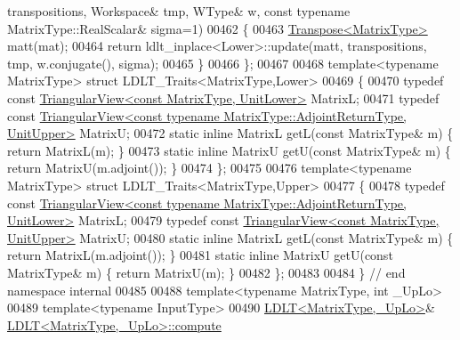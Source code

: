 \begin{DoxyCode}
      transpositions, Workspace& tmp, WType& w, \textcolor{keyword}{const} \textcolor{keyword}{typename} MatrixType::RealScalar& sigma=1)
00462   \{
00463     \hyperlink{group___core___module_class_eigen_1_1_transpose}{Transpose<MatrixType>} matt(mat);
00464     \textcolor{keywordflow}{return} ldlt\_inplace<Lower>::update(matt, transpositions, tmp, w.conjugate(), sigma);
00465   \}
00466 \};
00467 
00468 \textcolor{keyword}{template}<\textcolor{keyword}{typename} MatrixType> \textcolor{keyword}{struct }LDLT\_Traits<MatrixType,Lower>
00469 \{
00470   \textcolor{keyword}{typedef} \textcolor{keyword}{const} \hyperlink{group___core___module_class_eigen_1_1_triangular_view}{TriangularView<const MatrixType, UnitLower>} 
      MatrixL;
00471   \textcolor{keyword}{typedef} \textcolor{keyword}{const} 
      \hyperlink{group___core___module_class_eigen_1_1_triangular_view}{TriangularView<const typename MatrixType::AdjointReturnType, UnitUpper>}
       MatrixU;
00472   \textcolor{keyword}{static} \textcolor{keyword}{inline} MatrixL getL(\textcolor{keyword}{const} MatrixType& m) \{ \textcolor{keywordflow}{return} MatrixL(m); \}
00473   \textcolor{keyword}{static} \textcolor{keyword}{inline} MatrixU getU(\textcolor{keyword}{const} MatrixType& m) \{ \textcolor{keywordflow}{return} MatrixU(m.adjoint()); \}
00474 \};
00475 
00476 \textcolor{keyword}{template}<\textcolor{keyword}{typename} MatrixType> \textcolor{keyword}{struct }LDLT\_Traits<MatrixType,Upper>
00477 \{
00478   \textcolor{keyword}{typedef} \textcolor{keyword}{const} 
      \hyperlink{group___core___module_class_eigen_1_1_triangular_view}{TriangularView<const typename MatrixType::AdjointReturnType, UnitLower>}
       MatrixL;
00479   \textcolor{keyword}{typedef} \textcolor{keyword}{const} \hyperlink{group___core___module_class_eigen_1_1_triangular_view}{TriangularView<const MatrixType, UnitUpper>} 
      MatrixU;
00480   \textcolor{keyword}{static} \textcolor{keyword}{inline} MatrixL getL(\textcolor{keyword}{const} MatrixType& m) \{ \textcolor{keywordflow}{return} MatrixL(m.adjoint()); \}
00481   \textcolor{keyword}{static} \textcolor{keyword}{inline} MatrixU getU(\textcolor{keyword}{const} MatrixType& m) \{ \textcolor{keywordflow}{return} MatrixU(m); \}
00482 \};
00483 
00484 \} \textcolor{comment}{// end namespace internal}
00485 
00488 \textcolor{keyword}{template}<\textcolor{keyword}{typename} MatrixType, \textcolor{keywordtype}{int} \_UpLo>
00489 \textcolor{keyword}{template}<\textcolor{keyword}{typename} InputType>
00490 \hyperlink{group___cholesky___module_class_eigen_1_1_l_d_l_t}{LDLT<MatrixType,\_UpLo>}& \hyperlink{group___cholesky___module_class_eigen_1_1_l_d_l_t}{LDLT<MatrixType,\_UpLo>::compute}

\end{DoxyCode}
